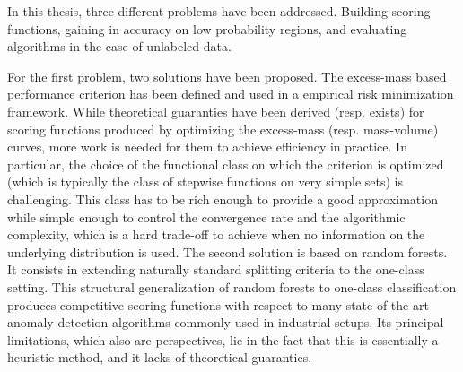 
In this thesis, three different problems have been addressed.
Building scoring functions, %
 gaining in accuracy on low probability regions, and evaluating algorithms in the case of unlabeled data.


For the first problem, two solutions have been proposed.
The excess-mass based performance criterion has been defined and used in a empirical risk minimization framework. %
While theoretical guaranties have been derived (resp. exists) for scoring functions produced by optimizing the excess-mass (resp. mass-volume) curves, more work is needed for them to achieve efficiency in practice. In particular, the choice of the functional class on which the criterion is optimized (which is typically the class of stepwise functions on very simple sets) is challenging. This class has to be rich enough to provide a good approximation while simple enough to control the convergence rate and the algorithmic complexity, which is a hard trade-off to achieve when no information on the underlying distribution is used.
%
The second solution is based on random forests. It consists in extending naturally standard splitting criteria to the one-class setting. This structural generalization of random forests to one-class classification produces competitive scoring functions with respect to many state-of-the-art anomaly detection algorithms commonly used in industrial setups. Its principal limitations, which also are perspectives, lie in the fact that this is essentially a heuristic method, and it lacks of theoretical guaranties.


